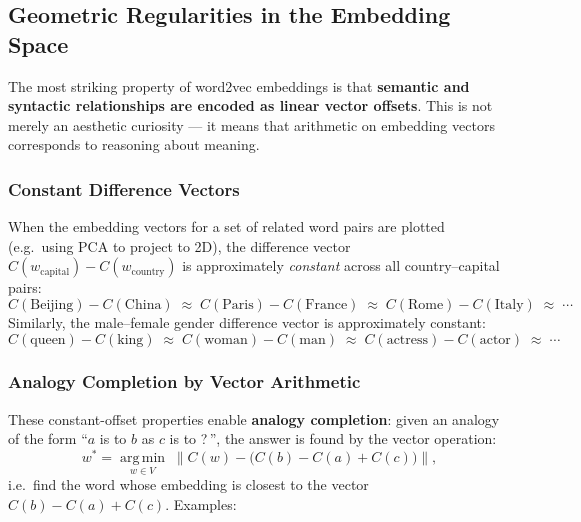 \documentclass[11pt,a4paper]{article}
\begin{document}
\subsection{Geometric Regularities in the Embedding Space}
\label{sec:we_analogies}

The most striking property of word2vec embeddings is that \textbf{semantic and syntactic relationships are encoded as linear vector offsets}. This is not merely an aesthetic curiosity — it means that arithmetic on embedding vectors corresponds to reasoning about meaning.

\subsubsection{Constant Difference Vectors}

When the embedding vectors for a set of related word pairs are plotted (e.g.\ using PCA to project to 2D), the difference vector $C(w_{\text{capital}}) - C(w_{\text{country}})$ is approximately \emph{constant} across all country--capital pairs:
\[
  C(\text{Beijing}) - C(\text{China}) \;\approx\; C(\text{Paris}) - C(\text{France}) \;\approx\; C(\text{Rome}) - C(\text{Italy}) \;\approx\; \cdots
\]
Similarly, the male--female gender difference vector is approximately constant:
\[
  C(\text{queen}) - C(\text{king}) \;\approx\; C(\text{woman}) - C(\text{man}) \;\approx\; C(\text{actress}) - C(\text{actor}) \;\approx\; \cdots
\]

\subsubsection{Analogy Completion by Vector Arithmetic}

These constant-offset properties enable \textbf{analogy completion}: given an analogy of the form ``$a$ is to $b$ as $c$ is to ?\,'', the answer is found by the vector operation:
\[
  w^* = \operatorname*{arg\,min}_{w \in V} \;\bigl\| C(w) - \bigl(C(b) - C(a) + C(c)\bigr) \bigr\|,
\]
i.e.\ find the word whose embedding is closest to the vector $C(b) - C(a) + C(c)$. Examples:
\end{document}
